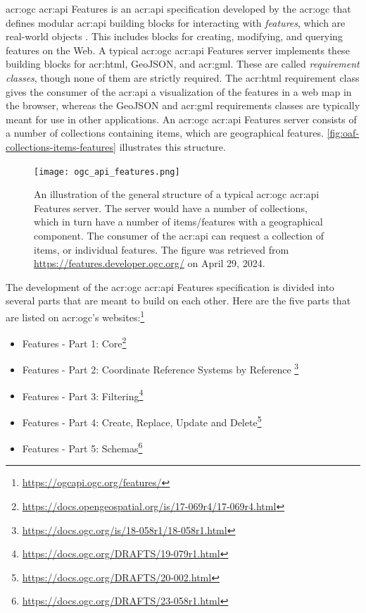 \acrshort{acr:ogc} \acrshort{acr:api} Features is an \acrshort{acr:api} specification developed by the \acrfull{acr:ogc} that defines modular \acrshort{acr:api} building blocks for interacting with \textit{features}, which are real-world objects \citep{opengeospatialconsortiumOGCAPIFeatures2022}. This includes blocks for creating, modifying, and querying features on the Web. A typical \acrshort{acr:ogc} \acrshort{acr:api} Features server implements these building blocks for \acrshort{acr:html}, GeoJSON, and \acrshort{acr:gml}. These are called \textit{requirement classes}, though none of them are strictly required. The \acrshort{acr:html} requirement class gives the consumer of the \acrshort{acr:api} a visualization of the features in a web map in the browser, whereas the GeoJSON and \acrshort{acr:gml} requirements classes are typically meant for use in other applications. An \acrshort{acr:ogc} \acrshort{acr:api} Features server consists of a number of collections containing items, which are geographical features. \autoref{fig:oaf-collections-items-features} illustrates this structure.

\begin{figure}[h]
    \centering
    \texttt{[image: ogc\_api\_features.png]}
    \caption[An illustration of the general structure of a typical OGC API Features server]{An illustration of the general structure of a typical \acrshort{acr:ogc} \acrshort{acr:api} Features server. The server would have a number of collections, which in turn have a number of items/features with a geographical component. The consumer of the \acrshort{acr:api} can request a collection of items, or individual features. The figure was retrieved from \url{https://features.developer.ogc.org/} on April 29, 2024.}
    \label{fig:oaf-collections-items-features}
\end{figure}

The development of the \acrshort{acr:ogc} \acrshort{acr:api} Features specification is divided into several parts that are meant to build on each other. Here are the five parts that are listed on \acrshort{acr:ogc}'s websites:\footnote{\url{https://ogcapi.ogc.org/features/}}

\begin{itemize}
    \item Features - Part 1: Core\footnote{\url{https://docs.opengeospatial.org/is/17-069r4/17-069r4.html}}
    \item Features - Part 2: Coordinate Reference Systems by Reference \footnote{\url{https://docs.ogc.org/is/18-058r1/18-058r1.html}}
    \item Features - Part 3: Filtering\footnote{\url{https://docs.ogc.org/DRAFTS/19-079r1.html}}
    \item Features - Part 4: Create, Replace, Update and Delete\footnote{\url{https://docs.ogc.org/DRAFTS/20-002.html}}
    \item Features - Part 5: Schemas\footnote{\url{https://docs.ogc.org/DRAFTS/23-058r1.html}}
\end{itemize}

